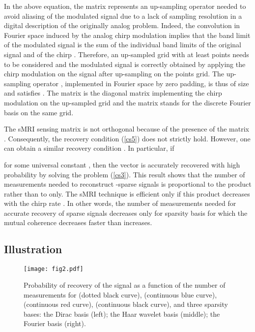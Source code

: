 \documentclass[10pt,draftcls, onecolumn]{IEEEtran}
\begin{document}
In the above equation, the matrix  represents an up-sampling operator needed to avoid aliasing of the modulated signal due to a lack of sampling resolution in a digital description of the originally analog problem. Indeed, the convolution in Fourier space induced by the analog chirp modulation implies that the band limit of the modulated signal is the sum of the individual band limits of the original signal and of the chirp . Therefore, an up-sampled grid with at least  points needs to be considered and the modulated signal is correctly obtained by applying the chirp modulation on the signal after up-sampling on the  points grid. The up-sampling operator , implemented in Fourier space by zero padding, is thus of size  and satisfies . The matrix  is the diagonal matrix implementing the chirp modulation on the up-sampled grid and the matrix  stands for the discrete Fourier basis on the same grid.

The sMRI sensing matrix  is not orthogonal because of the presence of the matrix . Consequently, the recovery condition (\ref{cs5}) does not strictly hold. However, one can obtain a similar recovery condition \cite{puy11a}. In particular, if

for some universal constant , then the vector  is accurately recovered with high probability by solving the  problem (\ref{cs3}). This result shows that the number of measurements  needed to reconstruct -sparse signals is proportional to the product  rather than to  only. The sMRI technique is efficient only if this product decreases with the chirp rate . In other words, the number of measurements needed for accurate recovery of sparse signals decreases only for sparsity basis  for which the mutual coherence  decreases faster than  increases.

\subsection{Illustration}
\label{sub:illustration}

\begin{figure}
\centering
\texttt{[image: fig2.pdf]}
\caption{\label{fig:theory ssp} Probability of recovery of the signal  as a function of the number of measurements  for  (dotted black curve),  (continuous blue curve),  (continuous red curve),  (continuous black curve), and three sparsity bases: the Dirac basis (left); the Haar wavelet basis (middle); the Fourier basis (right).}
\end{figure}
\end{document}
